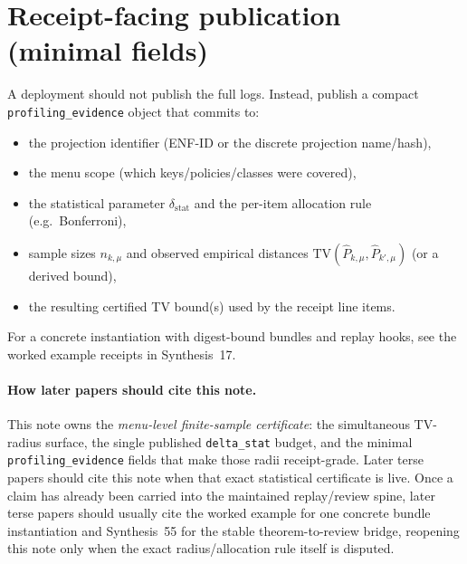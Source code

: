 \documentclass[11pt]{article}
\newcommand{\TV}{\mathrm{TV}}
\begin{document}
\section{Receipt-facing publication (minimal fields)}
A deployment should not publish the full logs.
Instead, publish a compact \texttt{profiling\_evidence} object that commits to:
\begin{itemize}[leftmargin=*]
\item the projection identifier (ENF-ID or the discrete projection name/hash),
\item the menu scope (which keys/policies/classes were covered),
\item the statistical parameter $\delta_{\mathrm{stat}}$ and the per-item allocation rule (e.g.\ Bonferroni),
\item sample sizes $n_{k,\mu}$ and observed empirical distances $\TV(\widehat P_{k,\mu},\widehat P_{k',\mu})$ (or a derived bound),
\item the resulting certified TV bound(s) used by the receipt line items. \cite{series:receiptitems}
\end{itemize}
For a concrete instantiation with digest-bound bundles and replay hooks, see the worked example receipts in Synthesis~17. \cite{series:workedexample}

\paragraph{How later papers should cite this note.}
This note owns the \emph{menu-level finite-sample certificate}: the simultaneous TV-radius surface, the single published \texttt{delta\_stat} budget, and the minimal \texttt{profiling\_evidence} fields that make those radii receipt-grade. Later terse papers should cite this note when that exact statistical certificate is live. Once a claim has already been carried into the maintained replay/review spine, later terse papers should usually cite the worked example for one concrete bundle instantiation and Synthesis~55 for the stable theorem-to-review bridge, reopening this note only when the exact radius/allocation rule itself is disputed.\cite{series:workedexample,series:seriesspines}
\end{document}
